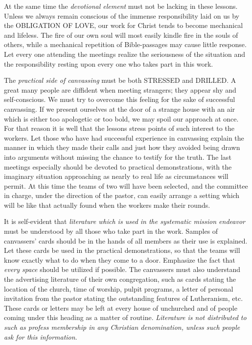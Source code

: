 \documentclass[
]{book}
\begin{document}
At the same time the \emph{devotional element} must not be lacking in these lessons. Unless we always remain conscious of the immense responsibility laid on us by the OBLIGATION OF LOVE, our work for Christ tends to become mechanical and lifeless. The fire of our own soul will most easily kindle fire in the souls of others, while a mechanical repetition of Bible-passages may cause little response. Let every one attending the meetings realize the seriousness of the situation and the responsibility resting upon every one who takes part in this work.

The \emph{practical side of canvassing} must be both STRESSED and DRILLED. A great many people are diffident when meeting strangers; they appear shy and self-conscious. We must try to overcome this feeling for the sake of successful canvassing. If we present ourselves at the door of a strange house with an air which is either too apologetic or too bold, we may spoil our approach at once. For that reason it is well that the lessons stress points of such interest to the workers. Let those who have had successful experience in canvassing explain the manner in which they made their calls and just how they avoided being drawn into arguments without missing the chance to testify for the truth. The last meetings especially should be devoted to practical demonstrations, with the imaginary situation approaching as nearly to real life as circumstances will permit. At this time the teams of two will have been selected, and the committee in charge, under the direction of the pastor, can easily arrange a setting which will be like that actually found when the workers make their rounds.

It is self-evident that \emph{literature which is used in the systematic mission endeavor} must be understood by all those who take part in the work. Samples of canvassers' cards should be in the hands of all members as their use is explained. Let these cards be used in the practical demonstrations, so that the teams will know exactly what to do when they come to a door. Emphasize the fact that \emph{every space} should be utilized if possible. The canvassers must also understand the advertising literature of their own congregation, such as cards stating the location of the church, time of worship, pulpit programs, a letter of personal invitation from the pastor stating the outstanding features of Lutheranism, etc. These cards or letters may be left at every house of unchurched and of people coming under this heading as a matter of routine. \emph{Literature is not distributed to such as profess membership in any Christian denomination, unless such people ask for this information}.
\end{document}

